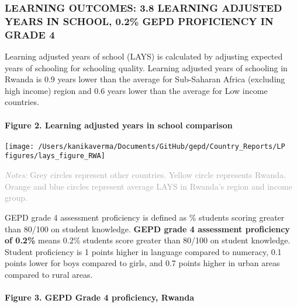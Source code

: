 \documentclass[twocolumn]{article}
\let\oldparagraph\paragraph
\renewcommand{\paragraph}[1]{\oldparagraph{#1}\mbox{}}
\begin{document}
\hypertarget{learning-outcomes-3.8-learning-adjusted-years-in-school-0.2-gepd-proficiency-in-grade-4}{%
\subsubsection{\texorpdfstring{\textbf{LEARNING OUTCOMES: 3.8 LEARNING
ADJUSTED YEARS IN SCHOOL, 0.2\% GEPD PROFICIENCY IN GRADE
4}}{LEARNING OUTCOMES: 3.8 LEARNING ADJUSTED YEARS IN SCHOOL, 0.2\% GEPD PROFICIENCY IN GRADE 4}}\label{learning-outcomes-3.8-learning-adjusted-years-in-school-0.2-gepd-proficiency-in-grade-4}}

Learning adjusted years of school (LAYS) is calculated by adjusting
expected years of schooling for schooling quality. Learning adjusted
years of schooling in Rwanda is 0.9 years lower than the average for
Sub-Saharan Africa (excluding high income) region and 0.6 years lower
than the average for Low income countries.

\hypertarget{figure-2.-learning-adjusted-years-in-school-comparison}{%
\paragraph{Figure 2. Learning adjusted years in school
comparison}\label{figure-2.-learning-adjusted-years-in-school-comparison}}

\texttt{[image: /Users/kanikaverma/Documents/GitHub/gepd/Country\_Reports/LP figures/lays\_figure\_RWA]}

{\scriptsize
    \textcolor{darkgray}{\textit{Notes:} Grey circles represent other countries. Yellow circle represents Rwanda. Orange and blue circles represent average LAYS in Rwanda's region and income group.}
  }

GEPD grade 4 assessment proficiency is defined as \% students scoring
greater than 80/100 on student knowledge. \textbf{GEPD grade 4
assessment proficiency of 0.2\%} means 0.2\% students score greater than
80/100 on student knowledge. Student proficiency is 1 points higher in
language compared to numeracy, 0.1 points lower for boys compared to
girls, and 0.7 points higher in urban areas compared to rural areas.

\vfill\null

\hypertarget{figure-3.-gepd-grade-4-proficiency-rwanda}{%
\paragraph{Figure 3. GEPD Grade 4 proficiency,
Rwanda}\label{figure-3.-gepd-grade-4-proficiency-rwanda}}
\end{document}

